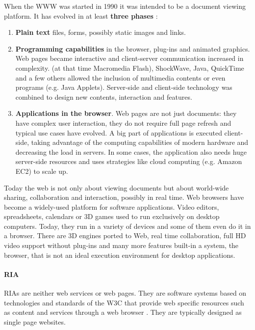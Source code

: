 When the \ac{WWW} was started in 1990 it was intended to be a document viewing platform.
It has evolved in at least \textbf{three phases} \cite{Anttonen:2011} \cite{Taivalsaari:2008}:

\begin{enumerate}
\item \textbf{Plain text} files, forms, possibly static images and links.
\item \textbf{Programming capabilities} in the browser, plug-ins and animated graphics. 
Web pages became interactive and client-server communication increased in complexity.
\flash (at that time Macromedia Flash), ShockWave, Java, QuickTime and a few others allowed the inclusion of multimedia contents or even programs (e.g. Java Applets).
Server-side and client-side technology was combined to design new contents, interaction and features.
\item \textbf{Applications in the browser}.
Web pages are not just documents: they have complex user interaction, they do not require full page refresh and typical use cases have evolved. 
A big part of applications is executed client-side, taking advantage of the computing capabilities of modern hardware and decreasing the load in servers. 
In some cases, the application also needs huge server-side resources and uses strategies like cloud computing (e.g. Amazon EC2) to scale up.
\end{enumerate}

Today the web is not only about viewing documents but about world-wide sharing, collaboration and interaction, possibly in real time. 
Web browsers have become a widely-used platform for software applications. 
Video editors, spreadsheets, calendars or 3D games used to run exclusively on desktop computers. 
Today, they run in a variety of devices and some of them even do it in a browser. 
There are 3D engines ported to Web, real time collaboration, full HD video support without plug-ins and many more features built-in a system, the browser, that is not an ideal execution environment for desktop applications.

\paragraph{\ac{RIA}}
\acp{RIA} are neither web services or web pages. 
They are software systems based on technologies and standards of the \ac{W3C} that provide web specific resources such as content and services through a web browser \cite{Kappel:2006}.
They are typically designed as single page websites.

